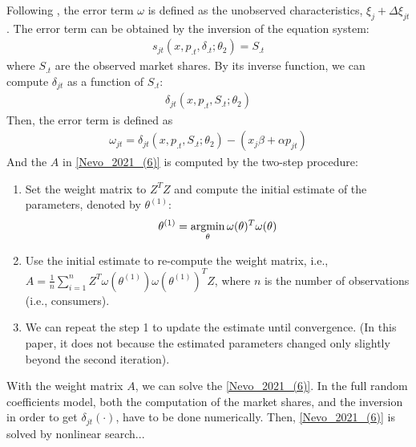 \documentclass[11pt]{elegantbook}
\newcommand{\argmin}{\operatornamewithlimits{argmin}}
\begin{document}
Following \cite{berry1994estimating}, the error term $\omega$ is defined as the unobserved characteristics, $\xi_j+\Delta\xi_{jt}$. The error term can be obtained by the inversion of the equation system:
\begin{equation}
    \begin{aligned}
        s_{jt}\left(x,p_{.t},\delta_{.t};\theta_2\right)=S_{.t}
    \end{aligned}
    \label{Nevo_2021_(7)}
\end{equation}
where $S_{.t}$ are the observed market shares. By its inverse function, we can compute $\delta_{jt}$ as a function of $S_{.t}$:
\begin{equation}
    \begin{aligned}
        \delta_{jt}(x,p_{.t},S_{.t};\theta_2)
    \end{aligned}
    \nonumber
\end{equation}
Then, the error term is defined as
\begin{equation}
    \begin{aligned}
        \omega_{jt}=\delta_{jt}(x,p_{.t},S_{.t};\theta_2)-(x_j\beta+\alpha p_{jt})
    \end{aligned}
    \nonumber
\end{equation}
And the $A$ in \eqref{Nevo_2021_(6)} is computed by the two-step procedure:
\begin{enumerate}
    \item Set the weight matrix to $Z^T Z$ and compute the initial estimate of the parameters, denoted by $\theta^{(1)}$:
    \begin{equation}
        \begin{aligned}
            \theta^{(1)}=\argmin_{\theta} \omega(\theta)^T\omega(\theta)
        \end{aligned}
        \nonumber
    \end{equation}
    \item Use the initial estimate to re-compute the weight matrix, i.e., $A=\frac{1}{n}\sum_{i=1}^n Z^T\omega(\theta^{(1)})\omega(\theta^{(1)})^TZ$, where $n$ is the number of observations (i.e., consumers).
    \item We can repeat the step 1 to update the estimate until convergence. (In this paper, it does not because the estimated parameters changed only slightly beyond the second iteration).
\end{enumerate}

With the weight matrix $A$, we can solve the \eqref{Nevo_2021_(6)}. In the full random coefficients model, both the computation of the market shares, and the inversion in order to get $\delta_{jt}(\cdot)$, have to be done numerically. Then, \eqref{Nevo_2021_(6)} is solved by nonlinear search...
\end{document}
